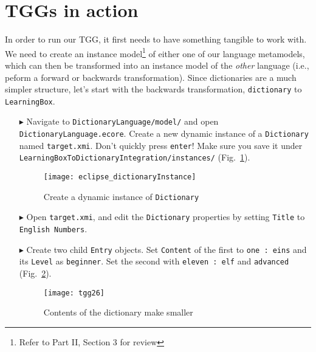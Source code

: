 \newpage
\section{TGGs in action}
\genHeader
\label{sect:TGGs_in_Action}

In order to run our TGG, it first needs to have something tangible to work with. We need to create an instance model\footnote{Refer to Part II, Section 3 for
review} of either one of our language metamodels, which can then be transformed into an instance model of the \emph{other} language (i.e., peform a forward or
backwards transformation). Since dictionaries are a much simpler structure, let's start with the backwards transformation, \texttt{dictionary} to
\texttt{LearningBox}.

\begin{itemize}

\item[$\blacktriangleright$] Navigate to \texttt{Dictionary\-Language/model/} and open \texttt{DictionaryLanguage.ecore}. Create a new
dynamic instance of a \texttt{Dictionary} named \texttt{target.xmi}. Don't quickly press \texttt{enter}! Make sure you save it under
\texttt{Learn\-ing\-Box\-To\-Dictionary\-In\-te\-gra\-tion/in\-stan\-ces/} (Fig.~\ref{fig:create_instance_dict}).

\begin{figure}[htbp]
\begin{center}
  \texttt{[image: eclipse\_dictionaryInstance]}
  \caption{Create a dynamic instance of \texttt{Dictionary}}
  \label{fig:create_instance_dict}
\end{center}
\end{figure}

\item[$\blacktriangleright$] Open \texttt{target.xmi}, and edit the \texttt{Dictionary} properties by setting \texttt{Title} to \texttt{English Numbers}.

\item[$\blacktriangleright$] Create two child \texttt{Entry} objects. Set \texttt{Content} of the first to \texttt{one : eins} and its
\texttt{Level} as \texttt{beginner}. Set the second with \texttt{eleven : elf} and \texttt{advanced} (Fig.~\ref{fig:dictionaryxmi}).

\begin{figure}[htbp]
\begin{center}
  \texttt{[image: tgg26]}
  \caption{Contents of the dictionary \update make smaller}
  \label{fig:dictionaryxmi}
\end{center}
\end{figure}


\end{itemize}
